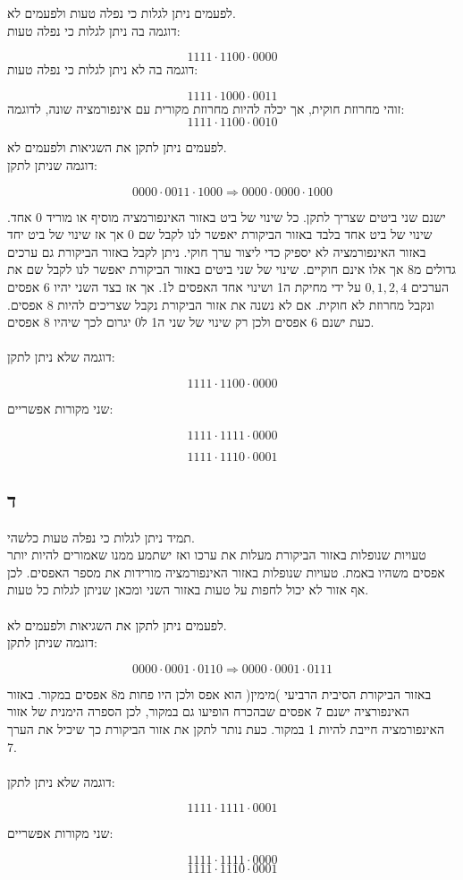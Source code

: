 \documentclass{article}
\begin{document}
לפעמים ניתן לגלות כי נפלה טעות ולפעמים לא.
\\
דוגמה בה ניתן לגלות כי נפלה טעות:

$$1111 \cdot 1100 \cdot 0000$$
דוגמה בה לא ניתן לגלות כי נפלה טעות:

$$1111 \cdot 1000 \cdot 0011$$
זוהי מחרוזת חוקית, אך יכלה להיות מחרוזת מקורית עם אינפורמציה שונה, לדוגמה:
$$1111 \cdot 1100 \cdot 0010$$

לפעמים ניתן לתקן את השגיאות ולפעמים לא.
\\
דוגמה שניתן לתקן:

$$0000 \cdot 0011 \cdot 1000 \Rightarrow 0000 \cdot 0000 \cdot 1000$$

ישנם שני ביטים שצריך לתקן.
כל שינוי של ביט באזור האינפורמציה מוסיף או מוריד 0 אחד.
שינוי של ביט אחד בלבד באזור הביקורת יאפשר לנו לקבל שם 0 אך אז שינוי של ביט יחד באזור האינפורמציה לא יספיק כדי ליצור ערך חוקי. ניתן לקבל באזור הביקורת גם ערכים גדולים מ8 אך אלו אינם חוקיים.
שינוי של שני ביטים באזור הביקורת יאפשר לנו לקבל שם את הערכים $0, 1, 2, 4$ על ידי מחיקת ה1 ושינוי אחד האפסים ל1. אך אז בצד השני יהיו 6 אפסים ונקבל מחרוזת לא חוקית.
אם לא נשנה את אזור הביקורת נקבל שצריכים להיות 8 אפסים. כעת ישנם 6 אפסים ולכן רק שינוי של שני ה1 ל0 יגרום לכך שיהיו 8 אפסים.
\\
\\
דוגמה שלא ניתן לתקן:

$$1111 \cdot 1100 \cdot 0000$$

שני מקורות אפשריים:

$$1111 \cdot 1111 \cdot 0000$$

$$1111 \cdot 1110 \cdot 0001$$

\subsection*{ד}

תמיד ניתן לגלות כי נפלה טעות כלשהי.
\\
טעויות שנופלות באזור הביקורת מעלות את ערכו ואז ישתמע ממנו שאמורים להיות יותר אפסים משהיו באמת.
טעויות שנופלות באזור האינפורמציה מורידות את מספר האפסים. לכן אף אזור לא יכול לחפות על טעות באזור השני ומכאן שניתן לגלות כל טעות.
\\
\\
לפעמים ניתן לתקן את השגיאות ולפעמים לא.
\\
דוגמה שניתן לתקן:

$$0000 \cdot 0001 \cdot 0110 \Rightarrow 0000 \cdot 0001 \cdot 0111$$

באזור הביקורת הסיבית הרביעי )מימין( הוא אפס ולכן היו פחות מ8 אפסים במקור.
באזור האינפורציה ישנם 7 אפסים שבהכרח הופיעו גם במקור, לכן הספרה הימנית של אזור האינפורמציה חייבת להיות 1 במקור. כעת נותר לתקן את אזור הביקורת כך שיכיל את הערך 7.
\\
\\
דוגמה שלא ניתן לתקן:

$$1111 \cdot 1111 \cdot 0001$$

שני מקורות אפשריים:

$$1111 \cdot 1111 \cdot 0000$$
$$1111 \cdot 1110 \cdot 0001$$
\end{document}
